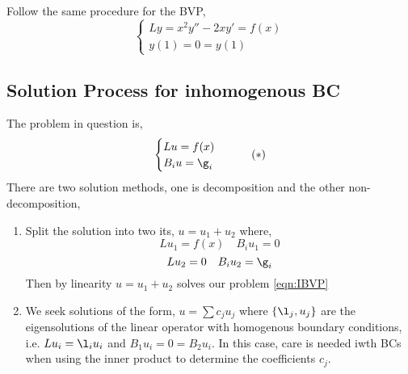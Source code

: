 \begin{exercise}
  Follow the same procedure for the BVP,
  $$ \begin{cases}
    Ly = x^2 y'' - 2xy' = f(x) \\
    y(1) = 0 = y(1)
  \end{cases} $$
\end{exercise}

\subsection{Solution Process for inhomogenous BC}
The problem in question is,
\begin{equation}
  \begin{cases}
    Lu = f(x) \\
    B_i u = \g_i
  \end{cases}\tag{$*$}\label{eqn:IBVP}
\end{equation}
There are two solution methods, one is decomposition and the other non-decomposition,
\begin{enumerate}
  \item Split the solution into two its, $u = u_1 + u_2$ where,
  $$ Lu_1 = f(x) \quad B_iu_1 = 0 $$
  $$ Lu_2 = 0 \quad B_iu_2 = \g_i $$
  Then by linearity $u = u_1 + u_2$ solves our problem \eqref{eqn:IBVP}
  \item We seek solutions of the form, $u = \sum c_ju_j$ where $\{\l_j, u_j\}$ are the eigensolutions of the linear operator with homogenous boundary conditions, i.e. $Lu_i = \l_i u_i$ and $B_1u_i = 0 = B_2u_i$. In this case, care is needed iwth BCs when using the inner product to determine the coefficients $c_j$.
\end{enumerate}

